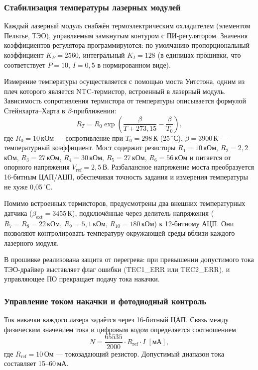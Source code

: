 \subsubsection{Стабилизация температуры лазерных модулей}

Каждый лазерный модуль снабжён термоэлектрическим охладителем (элементом
Пельтье, ТЭО), управляемым замкнутым контуром с ПИ-регулятором. Значения
коэффициентов регулятора программируются: по умолчанию пропорциональный
коэффициент $K_P = 2560$, интегральный $K_I = 128$ (в единицах прошивки,
что соответствует $P = 10$, $I = 0{,}5$ в нормированном виде).

Измерение температуры осуществляется с помощью моста Уитстона, одним из
плеч которого является NTC-термистор, встроенный в лазерный модуль. Зависимость
сопротивления термистора от температуры описывается формулой
Стейнхарта--Харта в $\beta$-приближении:
\begin{equation}
    R_T = R_0 \exp\!\left(\frac{\beta}{T + 273{,}15} -
    \frac{\beta}{T_0}\right),
    \label{eq:thermistor}
\end{equation}
где $R_0 = 10$\,кОм --- сопротивление при $T_0 = 298$\,К (25\,$^\circ$С),
$\beta = 3900$\,К --- температурный коэффициент. Мост содержит резисторы
$R_1 = 10$\,кОм, $R_2 = 2{,}2$\,кОм, $R_3 = 27$\,кОм, $R_4 = 30$\,кОм,
$R_5 = 27$\,кОм, $R_6 = 56$\,кОм и питается от опорного напряжения
$V_{\mathrm{ref}} = 2{,}5$\,В. Разбалансное напряжение моста преобразуется
16-битным ЦАП/АЦП, обеспечивая точность задания и измерения температуры
не хуже 0{,}05\,$^\circ$С.

Помимо встроенных термисторов, предусмотрены два внешних температурных
датчика ($\beta_{\mathrm{ext}} = 3455$\,К), подключённые через делитель
напряжения ($R_7 = R_8 = 22$\,кОм, $R_9 = 5{,}1$\,кОм, $R_{10} = 180$\,кОм)
к 12-битному АЦП. Они позволяют контролировать температуру окружающей среды
вблизи каждого лазерного модуля.

В прошивке реализована защита от перегрева: при превышении допустимого тока
ТЭО-драйвер выставляет флаг ошибки (TEC1\_ERR или TEC2\_ERR), и управляющее
ПО прекращает подачу тока накачки.

\subsubsection{Управление током накачки и фотодиодный контроль}

Ток накачки каждого лазера задаётся через 16-битный ЦАП. Связь между
физическим значением тока и цифровым кодом определяется соотношением
\begin{equation}
    N = \frac{65535}{2000} \cdot R_{\mathrm{ref}} \cdot I\;[\text{мА}],
    \label{eq:current-dac}
\end{equation}
где $R_{\mathrm{ref}} = 10$\,Ом --- токозадающий резистор. Допустимый
диапазон тока составляет 15--60\,мА.

